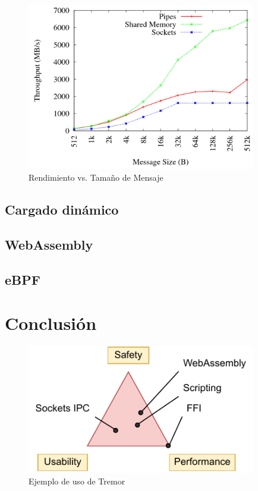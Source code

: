 \begin{figure}
    \centering
    \includegraphics[width=10cm]{./Imagenes/venkataraman2015evaluation2.png}
    \caption{Rendimiento vs. Tamaño de Mensaje \cite{venkataraman2015evaluation}}%
    \label{fig:ipc_comparison2}
\end{figure}

\subsection{Cargado dinámico}

\subsection{WebAssembly}

\subsection{eBPF}

\section{Conclusión}

\begin{figure}
    \centering
    \includegraphics[width=10cm]{./Imagenes/triangle.pdf}
    \caption{Ejemplo de uso de Tremor}%
    \label{fig:tech_triangle}
\end{figure}
